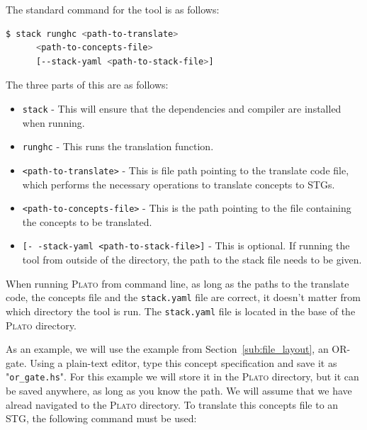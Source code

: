 \documentclass[british,conference,compsoc]{IEEEtran}
\newcommand{\noun}[1]{\textsc{#1}}
\begin{document}
\vspace{-2mm}

The standard command for the tool is as follows:

\vspace{-2mm}

\begin{lstlisting}[language=bash]
  $ stack runghc <path-to-translate> 
      <path-to-concepts-file> 
      [--stack-yaml <path-to-stack-file>]
\end{lstlisting}

\vspace{-1mm}

The three parts of this are as follows:
\begin{itemize}
\vspace{-2mm}
  \item \texttt{stack} - This will ensure that the dependencies and compiler 
  	are installed when running.
  \item \texttt{runghc} - This runs the translation function.
  \item \texttt{<path-to-translate>} - This is file path pointing to the 
  	translate code file, which performs the necessary operations to translate 
	concepts to STGs.
  \item \texttt{<path-to-concepts-file>} - This is the path pointing to the file
  	containing the concepts to be translated.
  \item \texttt{[-\,-stack-yaml <path-to-stack-file>]} - This is optional. If 
  	running the tool from outside of the directory, the path to the stack file 
	 needs to be given.
\end{itemize}
\vspace{-2mm}

When running \noun{Plato} from command line, as long as the paths to the 
translate code, the concepts file and the \texttt{stack.yaml} file are correct,
it doesn't matter from which directory the tool is run.  The \texttt{stack.yaml}
file is located in the base of the \noun{Plato} directory.

As an example, we will use the example from Section~\ref{sub:file_layout}, an 
OR-gate. Using a plain-text editor, type this concept specification and save it
as "\texttt{or\_gate.hs}". For this example we will store it in the \noun{Plato}
directory, but it can be saved anywhere, as long as you know the path.
We will assume that we have alread navigated to the \noun{Plato}
directory. To translate this concepts file to an STG, the following command
must be used:
\end{document}
